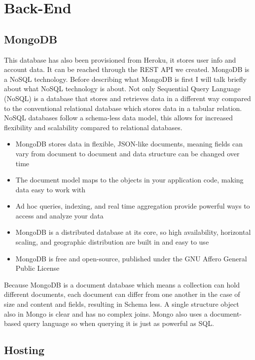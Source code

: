 \section{Back-End}
\subsection{MongoDB}
This database has also been provisioned from Heroku, it stores user info and account data. It can be reached through the REST API we created. MongoDB is a NoSQL technology. Before describing what MongoDB is first I will talk briefly about what NoSQL technology is about. Not only Sequential Query Language (NoSQL) is a database that stores and retrieves data in a different way compared to the conventional relational database which stores data in a tabular relation. NoSQL databases follow a schema-less data model, this allows for increased flexibility and scalability compared to relational databases.
\begin{itemize}
    \item MongoDB stores data in flexible, JSON-like documents, meaning fields can vary from document to document and data structure can be changed over time \cite{mongo}
    \item The document model maps to the objects in your application code, making data easy to work with \cite{mongo}
    \item Ad hoc queries, indexing, and real time aggregation provide powerful ways to access and analyze your data \cite{mongo}
    \item MongoDB is a distributed database at its core, so high availability, horizontal scaling, and geographic distribution are built in and easy to use \cite{mongo}
    \item MongoDB is free and open-source, published under the GNU Affero General Public License \cite{mongo}
\end{itemize}

 Because MongoDB is a document database which means a collection can hold different documents, each document can differ from one another in the case of size and content and fields, resulting in Schema less. A single structure object also in Mongo is clear and has no complex joins. Mongo also uses a document-based query language so when querying it is just as powerful as SQL.



\subsection{Hosting}
